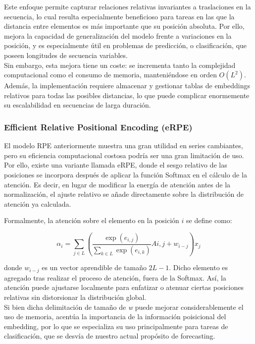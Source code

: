 Este enfoque permite capturar relaciones relativas invariantes a traslaciones en la secuencia, lo cual resulta especialmente beneficioso para tareas en las que la distancia entre elementos es más importante que su posición absoluta. Por ello, mejora la capacidad de generalización del modelo frente a variaciones en la posición, y es especialmente útil en problemas de predicción, o clasificación, que poseen longitudes de secuencia variables.\\

Sin embargo, esta mejora tiene un coste: se incrementa tanto la complejidad computacional como el consumo de memoria, manteniéndose en orden \(O(L^2)\). Además, la implementación requiere almacenar y gestionar tablas de embeddings relativos para todas las posibles distancias, lo que puede complicar enormemente su escalabilidad en secuencias de larga duración.


\subsubsection{Efficient Relative Positional Encoding (eRPE)}

El modelo RPE anteriormente muestra una gran utilidad en series cambiantes, pero su eficiencia computacional costosa podría ser una gran limitación de uso. Por ello, existe una variante llamada eRPE, donde el sesgo relativo de las posiciones se incorpora después de aplicar la función Softmax en el cálculo de la atención. Es decir, en lugar de modificar la energía de atención antes de la normalización, el ajuste relativo se añade directamente sobre la distribución de atención ya calculada.

Formalmente, la atención sobre el elemento en la posición \(i\) se define como:

\[
\alpha_i = \sum_{j \in L} \left( \frac{\exp(e_{i,j})}{\sum_{k \in L} \exp(e_{i,k})} Ai,j + w_{i-j} \right) x_j
\]

donde \(w_{i-j}\) es un vector aprendible de  tamaño $2L - 1$. Dicho elemento es agregado tras realizar el proceso de atención, fuera de la Softmax. Así, la atención puede ajustarse localmente para enfatizar o atenuar ciertas posiciones relativas sin distorsionar la distribución global.\\

 Si bien dicha delimitación de tamaño de \textit{w} puede mejorar considerablemente el uso de memoria, acentúa la importancia de la información poisicional del embedding, por lo que se especializa su uso principalmente para tareas de clasificación, que se desvía de nuestro actual propósito de forecasting.


